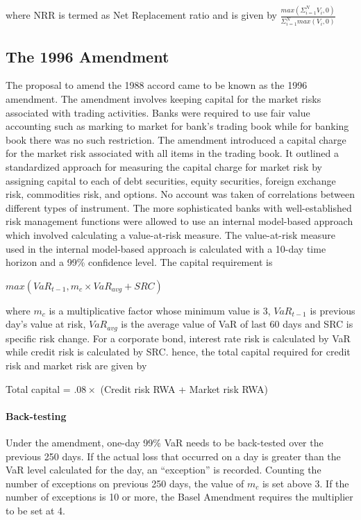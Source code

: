 \documentclass[11pt]{article}
\numberwithin{equation}{section}
\begin{document}
 where NRR is termed as Net Replacement ratio and is given by 
 $\frac{max \left(\Sigma_{i=1}^{N} V_i,0 \right)}{\Sigma_{i=1}^{N} max(V_i,0)}$
 
\subsection{The 1996 Amendment}
\medskip

The proposal to amend the 1988 accord came to be known as the 1996 amendment. The amendment involves keeping capital for the market risks associated with trading activities. Banks were required to use fair value accounting such as marking to market for bank's trading book while for banking book there was no such restriction. The amendment introduced a capital charge for the market risk associated with all items in the trading
book. It outlined a standardized approach for measuring the capital charge for market risk by assigning capital to each of debt securities, equity securities, foreign exchange risk, commodities risk, and options. No account was taken of
correlations between different types of instrument. The more sophisticated banks with well-established risk management functions were allowed to use an internal model-based approach which involved calculating a value-at-risk measure.
The value-at-risk measure used in the internal model-based approach is calculated with a 10-day time horizon and a 99\% confidence level. The capital requirement is
\begin{center}
 $max(VaR_{t-1},m_{c} \times VaR_{avg} +SRC)$
 \end{center}
 where $m_c$ is a multiplicative factor whose minimum value is 3, $VaR_{t-1}$ is previous day's value at risk, $VaR_{avg}$ is the average value of VaR of last 60 days and SRC is specific risk change. For a corporate bond, interest rate risk is calculated by VaR while credit risk is calculated by SRC. hence, the total capital required for credit risk and market risk are given by 
 \begin{center}
 Total capital = $.08 \times $ (Credit risk RWA + Market risk RWA)
 \end{center}
 
\paragraph{Back-testing}\mbox{}
\medskip

Under the amendment, one-day 99\% VaR needs to be back-tested over the previous 250 days. If the actual loss that
occurred on a day is greater than the VaR level calculated for the day, an ``exception” is recorded. Counting the number of exceptions on previous 250 days, the value of $m_c$ is set above 3. If the number of exceptions is 10 or more, the Basel Amendment requires the multiplier to be set at 4. 
\end{document}

